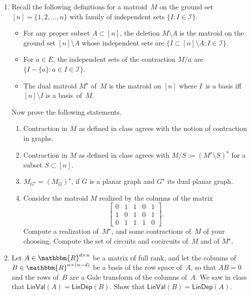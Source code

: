 \documentclass[11pt]{amsart}
\newcommand{\RR}{\mathbbm{R}}
\newcommand{\defn}[1]{{\color{blue}#1}}
\begin{document}
\bigskip
\begin{enumerate}
\item Recall the following definitions for a matroid~$M$ on the ground set $[n]=\{1,2,\dots,n\}$ with family of  independent sets $\{I:I\in\mathcal I\}$.

  \smallskip
\begin{itemize}[$\triangleright$]
\item
  For any proper subset $A\subset[n]$, the \defn{deletion}
  $M\setminus A$ is the matroid on the ground set $[n]\setminus A$ whose
  independent sets are $\{I\subset[n]\setminus A : I\in\mathcal I\}$.

\item
  For $a\in E$, the independent sets of the \defn{contraction} $M/a$ are $\big\{I-\{a\}:a\in I\in\mathcal I\big\}$.
  
\item
  The \defn{dual matroid} $M^\star$ of~$M$ is the matroid on $[n]$ where $I$~is a basis iff $[n]\setminus I$ is a basis~of~$M$.
\end{itemize}

\smallskip

Now prove the following statements.

\smallskip

  \begin{enumerate}
  \item Contraction in $M$ as defined in class agrees with the notion of
    contraction in graphs.
  \item Contraction in $M$ as defined in class agrees with $M/S := (M^\star\setminus S)^\star$ for a subset $S\subset[n]$.
  \item $M_{G^\star} = (M_G)^\star$, if $G$ is a planar graph and $G^\star$ its dual planar graph.
  \item 
    Consider the matroid $M$ realized by the columns of the matrix
    \[
      \begin{bmatrix}
        0 & 1 & 1 & 0 & 1 \\
        1 & 0 & 1 & 0 & 1 \\
        0 & 1 & 1 & 1 & 0
      \end{bmatrix}.
    \]
    Compute a realization of~$M^\star$, and some contractions of~$M$ of your choosing.
    Compute the set of circuits and cocircuits of~$M$ and of $M^\star$.
  \end{enumerate}

  \bigskip

\item
  Let $A\in\RR^{d \times n}$ be a matrix of full rank, and let the columns of $B\in\RR^{n\times(n-d)}$ be a basis of the row space of~$A$,
  so that $AB=0$ and the rows of~$B$ are a Gale transform of the columns of~$A$.
  We saw in class that $\mathsf{LinVal}(A)=\mathsf{LinDep}(B)$.
  Show that $\mathsf{LinVal}(B) = \mathsf{LinDep}(A)$.


\end{enumerate}
\end{document}
